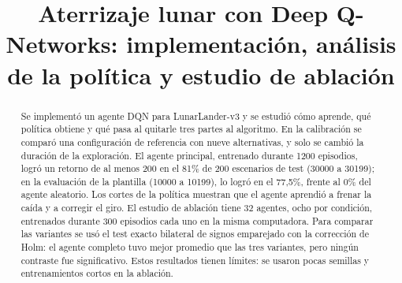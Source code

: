 \documentclass[conference]{IEEEtran}
\begin{document}
\title{Aterrizaje lunar con Deep Q-Networks: implementación, análisis de la política y estudio de ablación}
\author{
\and
{}
\and
{}
}
\maketitle

\begin{abstract}
Se implementó un agente DQN para LunarLander-v3 y se estudió cómo aprende, qué política obtiene y qué pasa al quitarle tres partes al algoritmo. En la calibración se comparó una configuración de referencia con nueve alternativas, y solo se cambió la duración de la exploración. El agente principal, entrenado durante 1200 episodios, logró un retorno de al menos 200 en el 81\% de 200 escenarios de test (30000 a 30199); en la evaluación de la plantilla (10000 a 10199), lo logró en el 77,5\%, frente al 0\% del agente aleatorio. Los cortes de la política muestran que el agente aprendió a frenar la caída y a corregir el giro. El estudio de ablación tiene 32 agentes, ocho por condición, entrenados durante 300 episodios cada uno en la misma computadora. Para comparar las variantes se usó el test exacto bilateral de signos emparejado con la corrección de Holm: el agente completo tuvo mejor promedio que las tres variantes, pero ningún contraste fue significativo. Estos resultados tienen límites: se usaron pocas semillas y entrenamientos cortos en la ablación.
\end{abstract}
\end{document}

